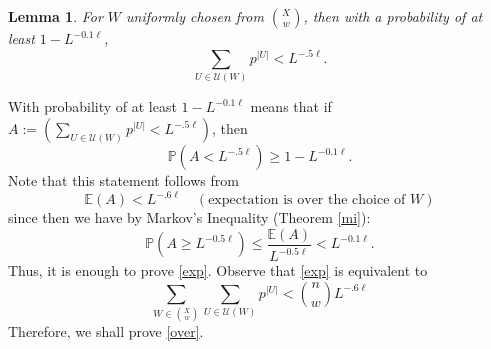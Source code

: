 \documentclass[12pt,oneside,reqno]{amsart}
\newtheorem{lemma}[theorem]{Lemma}
\theoremstyle{definition}
\numberwithin{equation}{theorem}
\newcommand{\PP}{{\mathbb P}}%
\begin{document}
\begin{lemma}
For $W$ uniformly chosen from $\binom{X}{w}$, then with a probability of at least $ 1 - L^{-0.1\ell}$,
$$
\sum_{U \in \mathcal{U}(W)} p^{|U|}<L^{-.5 \ell} .
$$
\end{lemma}
With probability of at least $ 1 - L^{-0.1\ell}$ means that if $A := \left( \sum_{U \in \mathcal{U}(W)} p^{|U|}<L^{-.5 \ell}\right) $, then $$ \PP(A<L^{-.5 \ell} ) \geq 1 - L^{-0.1\ell}.$$ 
Note that this statement follows from
\begin{equation}\label{exp}
\mathbb{E}(A)<L^{-.6 \ell} \quad (\text{expectation is over the choice of }W)
\end{equation}
since then we have by Markov's Inequality (Theorem \ref{mi}):
$$
\mathbb{P}\left(A \geq L^{-0.5\ell}\right) \leq \frac{\mathbb{E}(A)}{L^{-0.5\ell}}<L^{-0.1\ell}. 
$$
Thus, it is enough to prove \ref{exp}. Observe that \ref{exp} is equivalent to 
\begin{equation}\label{over}
\sum_{W \in \binom{X}{w}} \sum_{U \in \mathcal{U}(W)} p^{|U|}<\binom{n}{w} L^{-.6 \ell}
\end{equation}
Therefore, we shall prove \ref{over}.
\end{document}
